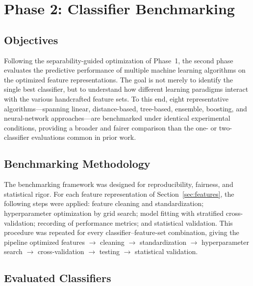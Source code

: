 \section{Phase 2: Classifier Benchmarking}
\label{sec:phase2}
\label{sec:phase2_method}

\subsection{Objectives}
\label{sec:phase2_objectives}

Following the separability-guided optimization of Phase~1, the second phase
evaluates the predictive performance of multiple machine learning algorithms on
the optimized feature representations. The goal is not merely to identify the
single best classifier, but to understand how different learning paradigms
interact with the various handcrafted feature sets. To this end, eight
representative algorithms---spanning linear, distance-based, tree-based,
ensemble, boosting, and neural-network approaches---are benchmarked under
identical experimental conditions, providing a broader and fairer comparison
than the one- or two-classifier evaluations common in prior work.

\subsection{Benchmarking Methodology}
\label{sec:phase2_methodology}

The benchmarking framework was designed for reproducibility, fairness, and
statistical rigor. For each feature representation of
Section~\ref{sec:features}, the following steps were applied: feature cleaning
and standardization; hyperparameter optimization by grid search; model fitting
with stratified cross-validation; recording of performance metrics; and
statistical validation. This procedure was repeated for every
classifier--feature-set combination, giving the pipeline optimized features
$\rightarrow$ cleaning $\rightarrow$ standardization $\rightarrow$ hyperparameter
search $\rightarrow$ cross-validation $\rightarrow$ testing $\rightarrow$
statistical validation.

\subsection{Evaluated Classifiers}
\label{sec:phase2_classifiers}

